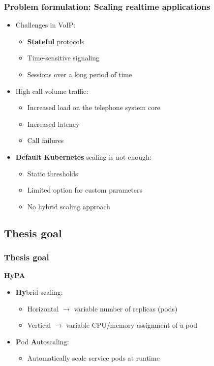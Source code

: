 \documentclass[11pt,t,usepdftitle=false,aspectratio=169]{beamer}
\begin{document}
\begin{frame}
	\frametitle{Problem formulation: Scaling {\color{uibkorange} realtime} applications}
	
	\begin{itemize}
		\item Challenges in VoIP:
		\begin{itemize}
			\item \textbf{\color{uibkorange} Stateful} protocols
			\item Time-sensitive signaling
			\item Sessions over a long period of time
		\end{itemize}
		
		\item High call volume traffic: 
		\begin{itemize}
			\item Increased load on the telephone system core
			\item Increased latency
			\item Call failures
		\end{itemize}
		
		\item \textbf{\color{uibkorange} Default Kubernetes} scaling is not enough:
		\begin{itemize}
			\item Static thresholds
			\item Limited option for custom parameters
			\item No hybrid scaling approach
		\end{itemize}
	\end{itemize}
\end{frame}

\subsection{Thesis goal}
\begin{frame}
	\frametitle{Thesis goal}
	
	\begin{block}{\textbf{HyPA}}
		\begin{itemize}
			\item \textbf{\color{uibkorange} Hy}brid scaling:
			\begin{itemize}
				\item Horizontal $\rightarrow$ variable number of replicas (pods)
				\item Vertical $\rightarrow$ variable CPU/memory assignment of a pod
			\end{itemize}

			\item \textbf{\color{uibkorange} P}od \textbf{\color{uibkorange} A}utoscaling:
			\begin{itemize}
				\item Automatically scale service pods at runtime
			\end{itemize}
		\end{itemize}
	\end{block}
\end{frame}
\end{document}
